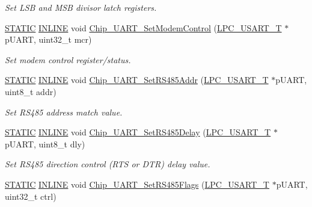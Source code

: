 \begin{DoxyCompactItemize}
\begin{DoxyCompactList}\small\item\em Set L\+SB and M\+SB divisor latch registers. \end{DoxyCompactList}\item 
\hyperlink{group__LPC__Types__Public__Macros_ga10b2d890d871e1489bb02b7e70d9bdfb}{S\+T\+A\+T\+IC} \hyperlink{group__LPC__Types__Public__Types_ga2eb6f9e0395b47b8d5e3eeae4fe0c116}{I\+N\+L\+I\+NE} void \hyperlink{group__UART__17XX__40XX_gad617968b795061ad0e4578aa79c4537d}{Chip\+\_\+\+U\+A\+R\+T\+\_\+\+Set\+Modem\+Control} (\hyperlink{structLPC__USART__T}{L\+P\+C\+\_\+\+U\+S\+A\+R\+T\+\_\+T} $\ast$p\+U\+A\+RT, uint32\+\_\+t mcr)
\begin{DoxyCompactList}\small\item\em Set modem control register/status. \end{DoxyCompactList}\item 
\hyperlink{group__LPC__Types__Public__Macros_ga10b2d890d871e1489bb02b7e70d9bdfb}{S\+T\+A\+T\+IC} \hyperlink{group__LPC__Types__Public__Types_ga2eb6f9e0395b47b8d5e3eeae4fe0c116}{I\+N\+L\+I\+NE} void \hyperlink{group__UART__17XX__40XX_ga72a3d146a8d6f8a8276080f91c3703e1}{Chip\+\_\+\+U\+A\+R\+T\+\_\+\+Set\+R\+S485\+Addr} (\hyperlink{structLPC__USART__T}{L\+P\+C\+\_\+\+U\+S\+A\+R\+T\+\_\+T} $\ast$p\+U\+A\+RT, uint8\+\_\+t addr)
\begin{DoxyCompactList}\small\item\em Set R\+S485 address match value. \end{DoxyCompactList}\item 
\hyperlink{group__LPC__Types__Public__Macros_ga10b2d890d871e1489bb02b7e70d9bdfb}{S\+T\+A\+T\+IC} \hyperlink{group__LPC__Types__Public__Types_ga2eb6f9e0395b47b8d5e3eeae4fe0c116}{I\+N\+L\+I\+NE} void \hyperlink{group__UART__17XX__40XX_ga4aa983b3f076828ee460a1c7146b3eac}{Chip\+\_\+\+U\+A\+R\+T\+\_\+\+Set\+R\+S485\+Delay} (\hyperlink{structLPC__USART__T}{L\+P\+C\+\_\+\+U\+S\+A\+R\+T\+\_\+T} $\ast$p\+U\+A\+RT, uint8\+\_\+t dly)
\begin{DoxyCompactList}\small\item\em Set R\+S485 direction control (R\+TS or D\+TR) delay value. \end{DoxyCompactList}\item 
\hyperlink{group__LPC__Types__Public__Macros_ga10b2d890d871e1489bb02b7e70d9bdfb}{S\+T\+A\+T\+IC} \hyperlink{group__LPC__Types__Public__Types_ga2eb6f9e0395b47b8d5e3eeae4fe0c116}{I\+N\+L\+I\+NE} void \hyperlink{group__UART__17XX__40XX_ga0bf41455dd390ae86f95f4bfe43a49a2}{Chip\+\_\+\+U\+A\+R\+T\+\_\+\+Set\+R\+S485\+Flags} (\hyperlink{structLPC__USART__T}{L\+P\+C\+\_\+\+U\+S\+A\+R\+T\+\_\+T} $\ast$p\+U\+A\+RT, uint32\+\_\+t ctrl)

\end{DoxyCompactItemize}
